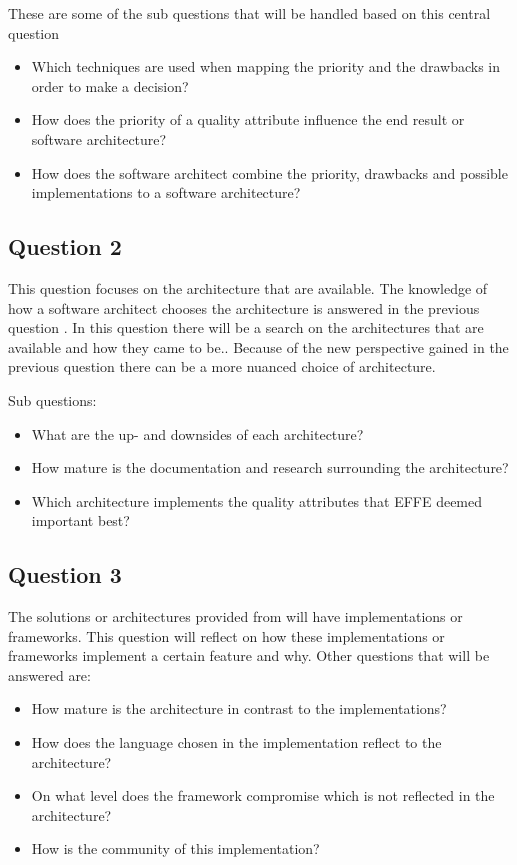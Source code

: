 These are some of the sub questions that will be handled based on this central question
\begin{itemize}
	\item Which techniques are used when mapping the priority and the drawbacks in order to make a decision?
	\item How does the priority of a quality attribute influence the end result or software architecture?
	\item How does the software architect combine the priority, drawbacks and possible implementations to a software architecture?
\end{itemize}

\subsection{Question 2}
\label{sec:Question2}

This question focuses on the architecture that are available. The knowledge of how a software architect chooses the architecture is answered in the previous question . In this question there will be a search on the architectures that are available and how they came to be.. Because of the new perspective gained in the previous question there can be a more nuanced choice of architecture.

Sub questions:
\begin{itemize}
	\item What are the up- and downsides of each architecture?
	\item How mature is the documentation and research surrounding the architecture?
	\item Which architecture implements the quality attributes that EFFE deemed important best?
\end{itemize}

\subsection{Question 3}

The solutions or architectures provided from  will have implementations or frameworks. This question will reflect on how these implementations or frameworks implement a certain feature and why. Other questions that will be answered are:
\begin{itemize}
	\item How mature is the architecture in contrast to the implementations?
	\item How does the language chosen in the implementation reflect to the architecture?
	\item On what level does the framework compromise which is not reflected in the architecture?
	\item How is the community of this implementation?
\end{itemize}

